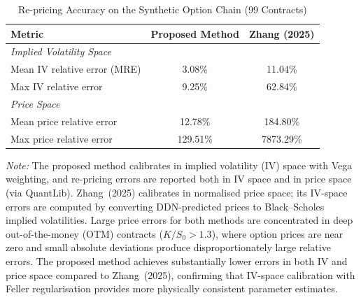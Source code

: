 \begin{table}[htbp]
  \centering
  \caption{Re-pricing Accuracy on the Synthetic Option Chain (99 Contracts)}
  \label{tab:repricing_accuracy}
  \begin{tabular}{lcc}
    \toprule
    \textbf{Metric} & \textbf{Proposed Method} & \textbf{Zhang (2025)} \\
    \midrule
    \multicolumn{3}{l}{\textit{Implied Volatility Space}} \\
    \quad Mean IV relative error (MRE)  & 3.08\%  & 11.04\% \\
    \quad Max IV relative error         & 9.25\%  & 62.84\% \\
    \midrule
    \multicolumn{3}{l}{\textit{Price Space}} \\
    \quad Mean price relative error     & 12.78\%   & 184.80\% \\
    \quad Max price relative error      & 129.51\%  & 7873.29\% \\
    \bottomrule
  \end{tabular}
  \begin{tablenotes}
    \small
    \item \textit{Note:} The proposed method calibrates in implied volatility (IV) space with Vega weighting, and re-pricing errors are reported both in IV space and in price space (via QuantLib). Zhang~(2025) calibrates in normalised price space; its IV-space errors are computed by converting DDN-predicted prices to Black--Scholes implied volatilities. Large price errors for both methods are concentrated in deep out-of-the-money (OTM) contracts ($K/S_0 > 1.3$), where option prices are near zero and small absolute deviations produce disproportionately large relative errors. The proposed method achieves substantially lower errors in both IV and price space compared to Zhang~(2025), confirming that IV-space calibration with Feller regularisation provides more physically consistent parameter estimates.
  \end{tablenotes}
\end{table}
